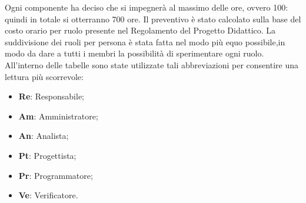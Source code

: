 Ogni componente ha deciso che si impegnerà al massimo delle ore, ovvero 100: quindi in totale si otterranno 700 ore. Il preventivo è stato calcolato sulla base del costo orario per ruolo presente nel Regolamento del Progetto Didattico. La suddivisione dei ruoli per persona è stata fatta nel modo più equo possibile,in modo da dare a tutti i membri la possibilità di 
sperimentare ogni ruolo. \\ 
All'interno delle tabelle sono state utilizzate tali abbreviazioni per consentire una lettura più scorrevole:
\begin{itemize}
    \item \textbf{Re}: Responsabile;
    \item \textbf{Am}: Amministratore;
    \item \textbf{An}: Analista;
    \item \textbf{Pt}: Progettista;
    \item \textbf{Pr}: Programmatore;
    \item \textbf{Ve}: Verificatore.
\end{itemize}


